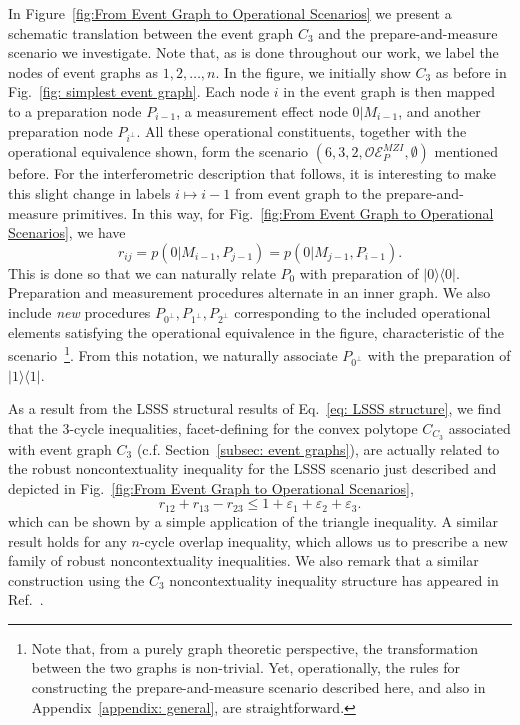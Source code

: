 \documentclass[letterpaper,onecolumn,12pt,accepted=2024-01-17]{article}
\begin{document}
{In Figure~\ref{fig:From Event Graph to Operational Scenarios} we present a schematic translation between the event graph $C_3$ and the prepare-and-measure scenario we investigate. Note that, as is done throughout our work, we label the nodes of event graphs as $1,2,\dots,n$. In the figure, we initially show $C_3$ as before in Fig.~\ref{fig: simplest event graph}. Each node $i$ in the event graph is then mapped to a preparation node $P_{i-1}$, a measurement effect node $0|M_{i-1}$, and another preparation node $P_{i^\perp}$. All these operational constituents, together with the operational equivalence shown, form the scenario $(6,3,2,\mathcal{OE}_P^{MZI},\emptyset)$ mentioned before. For the interferometric description that follows, it is interesting to make this slight change in labels $i \mapsto i-1$ from event graph to the prepare-and-measure primitives. In this way, for Fig.~\ref{fig:From Event Graph to Operational Scenarios}, we have $$r_{ij} = p(0|M_{i-1},P_{j-1}) = p(0|M_{j-1}, P_{i-1}).$$ This is done so that we can naturally relate $P_0$ with preparation of $\vert 0\rangle \langle 0 \vert$. Preparation and measurement procedures alternate in an inner graph. We also include \emph{new} procedures $P_{0^\perp}, P_{1^\perp}, P_{2^\perp}$ corresponding to the included operational elements satisfying the operational equivalence in the figure, characteristic of the scenario~\footnote{Note that, from a purely graph theoretic perspective, the transformation between the two graphs is non-trivial. Yet, operationally, the rules for constructing the prepare-and-measure scenario described here, and also in Appendix~\ref{appendix: general}, are straightforward.}. From this notation, we naturally associate $P_{0^\perp}$ with the preparation of $\vert 1\rangle \langle 1 \vert$. }

As a result from the LSSS structural results of Eq.~\eqref{eq: LSSS structure}, we find that the {3-cycle inequalities, facet-defining for the convex polytope  $C_{C_3}$ associated with event graph $C_3$ (c.f. Section~\ref{subsec: event graphs}), are} actually related to the robust noncontextuality inequality for the LSSS scenario just described and depicted in Fig.~\ref{fig:From Event Graph to Operational Scenarios},
\begin{equation}\label{eq: robust c3 inequality}
    r_{12}+r_{13}-r_{23} \leq 1 + \varepsilon_1+\varepsilon_2+\varepsilon_3.
\end{equation}
which can be shown by a simple application of the triangle inequality. A similar result holds for any $n$-cycle overlap inequality, which allows us to prescribe a new family of robust noncontextuality inequalities. We also remark that a similar construction using the $C_3$ noncontextuality inequality structure has appeared in Ref.~\cite{flatt2021contextual}.
\end{document}
